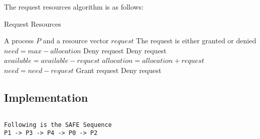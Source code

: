 The request resources algorithm is as follows:

\begin{algorithm}
	\caption{Request Resources}
	\label{alg:request_resources}
	\begin{algorithmic}
		\Require A process $P$ and a resource vector $request$
		\Ensure The request is either granted or denied
		\State $need = max - allocation$
		\State Deny request
		\Else
		\State Deny request
		\Else
		\State $available = available - request$
		\State $allocation = allocation + request$
		\State $need = need - request$
		\State Grant request
		\Else
		\State Deny request
		\EndIf
		\EndIf
		\EndIf
	\end{algorithmic}
\end{algorithm}

\subsection{Implementation}

\inputminted[fontsize=\footnotesize,autogobble]{c}{code/bankers.c}

\begin{lstlisting}[style=output]
Following is the SAFE Sequence
P1 -> P3 -> P4 -> P0 -> P2
\end{lstlisting}
